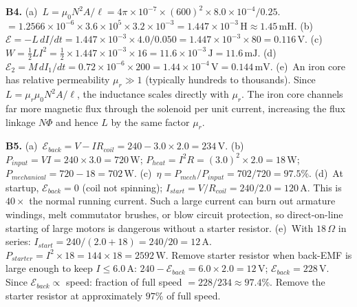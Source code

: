 \textbf{B4.}
(a)~$L=\mu_0N^2A/\ell
=4\pi\times10^{-7}\times(600)^2
\times8.0\times10^{-4}/0.25$.
$=1.2566\times10^{-6}\times3.6\times10^5
\times3.2\times10^{-3}
=1.447\times10^{-3}\,\text{H}\approx1.45\,\text{mH}$.
\quad
(b)~$\mathcal{E}=-L\,dI/dt
=1.447\times10^{-3}\times4.0/0.050
=1.447\times10^{-3}\times80=0.116\,\text{V}$. \quad
(c)~$W=\tfrac{1}{2}LI^2
=\tfrac{1}{2}\times1.447\times10^{-3}\times16
=11.6\times10^{-3}\,\text{J}=11.6\,\text{mJ}$. \quad
(d)~$\mathcal{E}_2=M\,dI_1/dt
=0.72\times10^{-6}\times200
=1.44\times10^{-4}\,\text{V}=0.144\,\text{mV}$. \quad
(e)~An iron core has relative permeability
$\mu_r\gg1$ (typically hundreds to thousands).
Since $L=\mu_r\mu_0N^2A/\ell$, the inductance
scales directly with $\mu_r$. The iron core channels
far more magnetic flux through the solenoid per unit
current, increasing the flux linkage $N\Phi$ and hence
$L$ by the same factor $\mu_r$.

\textbf{B5.}
(a)~$\mathcal{E}_{back}=V-IR_{coil}
=240-3.0\times2.0=234\,\text{V}$. \quad
(b)~$P_{input}=VI=240\times3.0=720\,\text{W}$;
$P_{heat}=I^2R=(3.0)^2\times2.0=18\,\text{W}$;
$P_{mechanical}=720-18=702\,\text{W}$. \quad
(c)~$\eta=P_{mech}/P_{input}=702/720=97.5\%$. \quad
(d)~At startup, $\mathcal{E}_{back}=0$ (coil not
spinning); $I_{start}=V/R_{coil}=240/2.0=120\,\text{A}$.
This is $40\times$ the normal running current.
Such a large current can burn out armature windings,
melt commutator brushes, or blow circuit protection,
so direct-on-line starting of large motors is dangerous
without a starter resistor. \quad
(e)~With $18\,\Omega$ in series:
$I_{start}=240/(2.0+18)=240/20=12\,\text{A}$.
$P_{starter}=I^2\times18=144\times18=2592\,\text{W}$.
Remove starter resistor when back-EMF is large enough
to keep $I\leq6.0\,\text{A}$:
$240-\mathcal{E}_{back}=6.0\times2.0=12\,\text{V}$;
$\mathcal{E}_{back}=228\,\text{V}$.
Since $\mathcal{E}_{back}\propto$ speed:
fraction of full speed $=228/234\approx97.4\%$.
Remove the starter resistor at approximately
$97\%$ of full speed.

\endgroup


